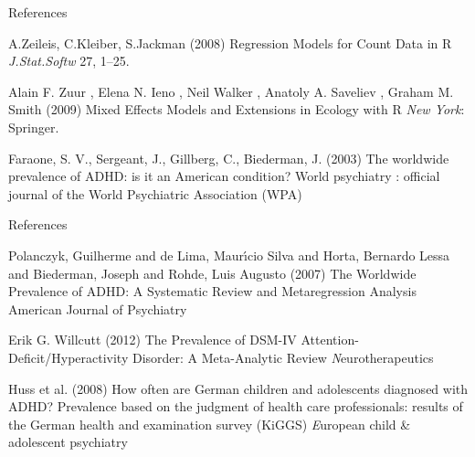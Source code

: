 \documentclass[aspectratio=169,xcolor=dvipsnames]{beamer}
\makeatletter
\def\beamer@writeslidentry@miniframesoff{%
	\expandafter\beamer@ifempty\expandafter{\beamer@framestartpage}{}%
	{%
		\clearpage\beamer@notesactions%
	}
}
\newcommand*{\miniframesoff}{\let\beamer@writeslidentry=\beamer@writeslidentry@miniframesoff}
\makeatother
\begin{document}
	\miniframesoff
	\begin{frame}{References}
		\footnotesize{
			\begin{thebibliography}{99}
				 A.Zeileis, C.Kleiber, S.Jackman (2008)
				\newblock Regression Models for Count Data in R
				\newblock \emph{J.Stat.Softw} 27, 1–25.
			\end{thebibliography}
		}
		\footnotesize{
			\begin{thebibliography}{99}
				  Alain F. Zuur , Elena N. Ieno , Neil Walker , Anatoly A. Saveliev , Graham M. Smith (2009)
				\newblock Mixed Effects Models and Extensions in Ecology with R
				\newblock \emph{New York}: Springer.
			\end{thebibliography}
		}
		
		\footnotesize{
			\begin{thebibliography}{99}
				 Faraone, S. V., Sergeant, J., Gillberg, C.,  Biederman, J. (2003)
				\newblock The worldwide prevalence of ADHD: is it an American condition?
				\newblock World psychiatry : official journal of the World Psychiatric Association (WPA)
			\end{thebibliography}
		}
		\end{frame}
		\setbeamertemplate{headline}{}
		\begin{frame}{References}
		\footnotesize{
			\begin{thebibliography}{99}
				 Polanczyk, Guilherme and de Lima, Maur\'{\i}cio Silva and Horta, Bernardo Lessa and Biederman, Joseph and Rohde, Luis Augusto (2007)
				\newblock The Worldwide Prevalence of ADHD: A Systematic Review and Metaregression Analysis
				\newblock American Journal of Psychiatry
			\end{thebibliography}
		}
		\footnotesize{
			\begin{thebibliography}{99}
				Erik G. Willcutt (2012)
				\newblock The Prevalence of DSM-IV Attention-Deficit/Hyperactivity Disorder: A Meta-Analytic Review
				\newblock \emph Neurotherapeutics
			\end{thebibliography}
		}
		\footnotesize{
			\begin{thebibliography}{99}
				Huss et al. (2008) 
				\newblock How often are German children and adolescents diagnosed with ADHD? Prevalence based on the judgment of health care professionals: results of the German health and examination survey (KiGGS)
				\newblock \emph European child \& adolescent psychiatry
			\end{thebibliography}
		}
	
		
		
	\end{frame}
\end{document}
